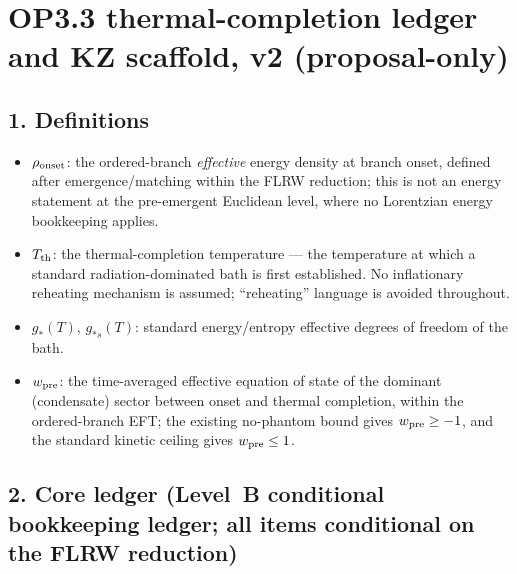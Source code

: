 \section*{OP3.3 thermal-completion ledger and KZ scaffold, v2
(proposal-only)}

\subsection*{1. Definitions}
\begin{itemize}
  \item $\rho_{\rm onset}$: the ordered-branch \emph{effective}
    energy density at branch onset, defined after
    emergence/matching within the FLRW reduction; this is not an
    energy statement at the pre-emergent Euclidean level, where no
    Lorentzian energy bookkeeping applies.
  \item $T_{\rm th}$: the thermal-completion temperature ---
    the temperature at which a standard radiation-dominated bath
    is first established.  No inflationary reheating mechanism is
    assumed; ``reheating'' language is avoided throughout.
  \item $g_*(T)$, $g_{*s}(T)$: standard energy/entropy effective
    degrees of freedom of the bath.
  \item $w_{\rm pre}$: the time-averaged effective equation of
    state of the dominant (condensate) sector between onset and
    thermal completion, within the ordered-branch EFT; the
    existing no-phantom bound gives $w_{\rm pre}\ge-1$, and the
    standard kinetic ceiling gives $w_{\rm pre}\le1$.
\end{itemize}

\subsection*{2. Core ledger (Level~B conditional bookkeeping
ledger; all items conditional on the FLRW reduction)}

